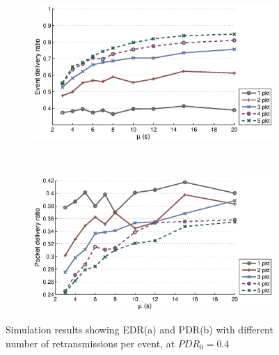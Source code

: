 \begin{figure}[p]
    \centering
    \begin{subfigure}[t]{0.9\textwidth}
        \centering
        \includegraphics[width=\textwidth] {../../sw/pc/matlab/simulation-result/retrans-count-edr-250evt-pdr0.4.eps}
        \caption{}
    \end{subfigure} 
    \\
    \begin{subfigure}[t]{0.9\textwidth}
        \centering
        \includegraphics[width=\textwidth] {../../sw/pc/matlab/simulation-result/retrans-count-pdr-250evt-pdr0.4.eps}
        \caption{}
    \end{subfigure}
    \caption[EDR and PDR with different transmission redundancy, $PDR_0 = 0.4$]{Simulation results showing EDR(a) and PDR(b) with different number of retransmissions per event, at $PDR_0 = 0.4$}\label{fig:retrans-lambda-0.4}
\end{figure}


